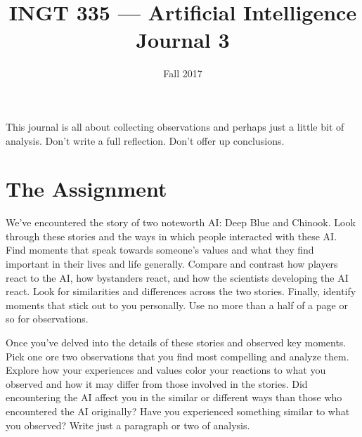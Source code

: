 \documentclass[nobib]{tufte-handout}
\title{INGT 335 --- Artificial Intelligence \\ Journal 3}
\author{}
\date{ Fall 2017 }
\begin{document}
\maketitle


This journal is all about collecting observations and perhaps just a little bit of analysis. Don't write a full reflection. Don't offer up conclusions.

\section{The Assignment}

We've encountered the story of two noteworth AI\@: Deep Blue and Chinook. Look through these stories and the ways in which people interacted with these AI\@. Find moments that speak towards someone's values and what they find important in their lives and life generally. Compare and contrast how players react to the AI, how bystanders react, and how the scientists developing the AI react. Look for similarities and differences across the two stories. Finally, identify moments that stick out to you personally. Use no more than a half of a page or so for observations.

Once you've delved into the details of these stories and observed key moments. Pick one ore two observations that you find most compelling and analyze them. Explore how your experiences and values color your reactions to what you observed and how it may differ from those involved in the stories. Did encountering the AI affect you in the similar or different ways than those who encountered the AI originally? Have you experienced something similar to what you observed? Write just a paragraph or two of analysis. 
\end{document}
